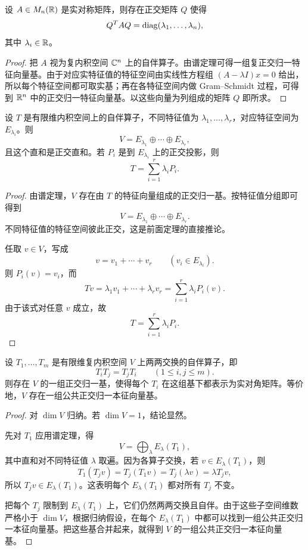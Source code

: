 \begin{corollary}[实对称矩阵的正交对角化]
设 $A\in M_n(\mathbb{R})$ 是实对称矩阵，则存在正交矩阵 $Q$ 使得
\[
Q^TAQ=\mathrm{diag}(\lambda_1,\dots,\lambda_n),
\]
其中 $\lambda_i\in\mathbb{R}$。
\end{corollary}

\begin{proof}
把 $A$ 视为复内积空间 $\mathbb{C}^n$ 上的自伴算子。由谱定理可得一组复正交归一特征向量基。由于对应实特征值的特征空间由实线性方程组 $(A-\lambda I)x=0$ 给出，所以每个特征空间都可取实基；再在各特征空间内做 Gram--Schmidt 过程，可得到 $\mathbb{R}^n$ 中的正交归一特征向量基。以这些向量为列组成的矩阵 $Q$ 即所求。
\end{proof}

\begin{theorem}[谱分解]
设 $T$ 是有限维内积空间上的自伴算子，不同特征值为 $\lambda_1,\dots,\lambda_r$，对应特征空间为 $E_{\lambda_i}$。则
\[
V=E_{\lambda_1}\oplus\cdots\oplus E_{\lambda_r},
\]
且这个直和是正交直和。若 $P_i$ 是到 $E_{\lambda_i}$ 上的正交投影，则
\[
T=\sum_{i=1}^r \lambda_i P_i.
\]
\end{theorem}

\begin{proof}
由谱定理，$V$ 存在由 $T$ 的特征向量组成的正交归一基。按特征值分组即可得到
\[
V=E_{\lambda_1}\oplus\cdots\oplus E_{\lambda_r}.
\]
不同特征值的特征空间彼此正交，这是前面定理的直接推论。

任取 $v\in V$，写成
\[
v=v_1+\cdots+v_r\qquad (v_i\in E_{\lambda_i}).
\]
则 $P_i(v)=v_i$，而
\[
Tv=\lambda_1v_1+\cdots+\lambda_rv_r=\sum_{i=1}^r \lambda_i P_i(v).
\]
由于该式对任意 $v$ 成立，故
\[
T=\sum_{i=1}^r \lambda_i P_i.
\]
\end{proof}

\begin{theorem}[交换自伴算子的同时对角化]
设 $T_1,\dots,T_m$ 是有限维复内积空间 $V$ 上两两交换的自伴算子，即
\[
T_iT_j=T_jT_i\qquad (1\le i,j\le m).
\]
则存在 $V$ 的一组正交归一基，使得每个 $T_i$ 在这组基下都表示为实对角矩阵。等价地，$V$ 存在一组公共正交归一本征向量基。
\end{theorem}

\begin{proof}
对 $\dim V$ 归纳。若 $\dim V=1$，结论显然。

先对 $T_1$ 应用谱定理，得
\[
V=\bigoplus_{\lambda} E_{\lambda}(T_1),
\]
其中直和对不同特征值 $\lambda$ 取遍。因为各算子交换，若 $v\in E_{\lambda}(T_1)$，则
\[
T_1(T_jv)=T_j(T_1v)=T_j(\lambda v)=\lambda T_jv,
\]
所以 $T_jv\in E_{\lambda}(T_1)$。这表明每个 $E_{\lambda}(T_1)$ 都对所有 $T_j$ 不变。

把每个 $T_j$ 限制到 $E_{\lambda}(T_1)$ 上，它们仍然两两交换且自伴。由于这些子空间维数严格小于 $\dim V$，根据归纳假设，在每个 $E_{\lambda}(T_1)$ 中都可以找到一组公共正交归一本征向量基。把这些基合并起来，就得到 $V$ 的一组公共正交归一本征向量基。
\end{proof}

